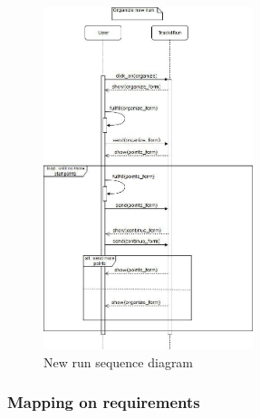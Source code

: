 \begin{figure}[H]
\includegraphics[width=\linewidth, height=10cm, keepaspectratio]{./Images/sequence_diag_new_run.jpg}
\centering
\caption{New run sequence diagram}
\end{figure}
\newpage
{\color{secblue}\subsubsection{Mapping on requirements}}
